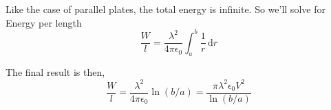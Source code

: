 \documentclass[10pt,a4paper]{article}
\begin{document}
Like the case of parallel plates, the total energy is infinite. So we'll solve for Energy per length
\begin{equation}
\frac{W}{l}=\frac{\lambda^2}{4\pi\epsilon_0}\int_a^b \frac{1}{r}\,\mathrm{d}r
\end{equation}

The final result is then,
\begin{equation}
\frac{W}{l}
=\frac{\lambda^2}{4\pi\epsilon_0}\ln(b/a)
=\frac{\pi\lambda^2\epsilon_0 V^2}{\ln(b/a)}
\end{equation}
\end{document}
